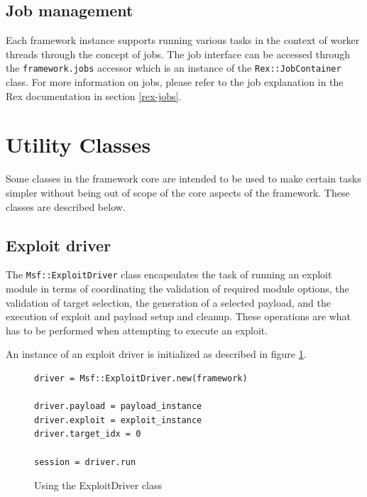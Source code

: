 \documentclass{report}
\begin{document}
        \subsection{Job management}

\par
Each framework instance supports running various tasks in the
context of worker threads through the concept of jobs.  The job
interface can be accessed through the \texttt{framework.jobs}
accessor which is an instance of the \texttt{Rex::JobContainer}
class.  For more information on jobs, please refer to the job
explanation in the Rex documentation in section \ref{rex-jobs}.

    \section{Utility Classes}

\par
Some classes in the framework core are intended to be used to make
certain tasks simpler without being out of scope of the core aspects
of the framework.  These classes are described below.

        \subsection{Exploit driver}

\par
The \texttt{Msf::ExploitDriver} class encapsulates the task of
running an exploit module in terms of coordinating the validation of
required module options, the validation of target selection, the
generation of a selected payload, and the execution of exploit and
payload setup and cleanup.  These operations are what has to be
performed when attempting to execute an exploit.

\par
An instance of an exploit driver is initialized as described in
figure \ref{fig-code-exploit-driver}.

\begin{figure}[h]
\begin{verbatim}
driver = Msf::ExploitDriver.new(framework)

driver.payload = payload_instance
driver.exploit = exploit_instance
driver.target_idx = 0

session = driver.run
\end{verbatim}
\caption{Using the ExploitDriver class}
\label{fig-code-exploit-driver}
\end{figure}
\end{document}
